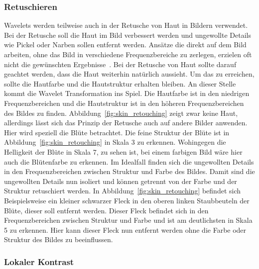 \documentclass[12pt, a4paper, ngerman]{article}
\begin{document}
\subsubsection{Retuschieren}

Wavelets werden teilweise auch in der Retusche von Haut in Bildern verwendet.
Bei der Retusche soll die Haut im Bild verbessert werden und ungewollte Details
wie Pickel oder Narben sollen entfernt werden.
Ansätze die direkt auf dem Bild arbeiten,
ohne das Bild in verschiedene Frequenzbereiche zu zerlegen,
erzielen oft nicht die gewünschten Ergebnisse~\cite{skin_retouching}.
Bei der Retusche von Haut sollte darauf geachtet werden,
dass die Haut weiterhin natürlich aussieht.
Um das zu erreichen, sollte die Hautfarbe und die Hautstruktur erhalten bleiben.
An dieser Stelle kommt die Wavelet Transformation ins Spiel.
Die Hautfarbe ist in den niedrigen Frequenzbereichen
und die Hautstruktur ist in den höheren Frequenzbereichen des Bildes zu finden.
Abbildung~\ref{fig:skin_retouching} zeigt zwar keine Haut, 
allerdings lässt sich das Prinzip der Retusche auch auf andere Bilder anwenden.
Hier wird speziell die Blüte betrachtet.
Die feine Struktur der Blüte ist in Abbildung~\ref{fig:skin_retouching} in Skala 3 zu erkennen.
Wohingegen die Helligkeit der Blüte in Skala 7, zu sehen ist,
bei einem farbigen Bild wäre hier auch die Blütenfarbe zu erkennen.
Im Idealfall finden sich die ungewollten Details
in den Frequenzbereichen zwischen Struktur und Farbe des Bildes.
Damit sind die ungewollten Details nun isoliert und können getrennt von
der Farbe und der Struktur retuschiert werden.
In Abbildung~\ref{fig:skin_retouching} befindet sich Beispielsweise ein kleiner schwarzer Fleck
in den oberen linken Staubbeuteln der Blüte, dieser soll entfernt werden.
Dieser Fleck befindet sich in den Frequenzbereichen zwischen Struktur und Farbe
und ist am deutlichsten in Skala 5 zu erkennen.
Hier kann dieser Fleck nun entfernt werden 
ohne die Farbe oder Struktur des Bildes zu beeinflussen.

\subsubsection{Lokaler Kontrast}
\end{document}
